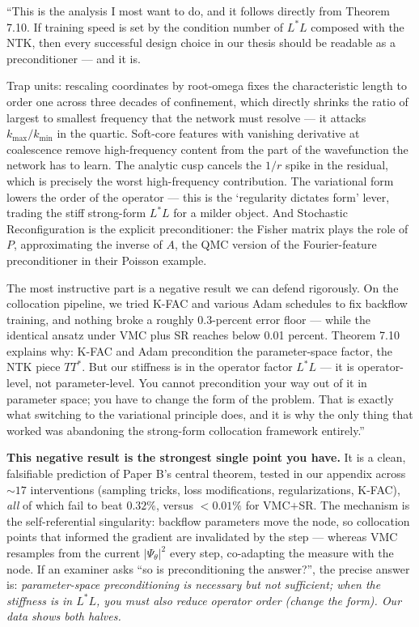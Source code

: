 \documentclass[11pt]{article}
\begin{document}
\begin{say}
``This is the analysis I most want to do, and it follows directly from Theorem 7.10. If training
speed is set by the condition number of $L^\ast L$ composed with the NTK, then every successful
design choice in our thesis should be readable as a preconditioner --- and it is.

Trap units: rescaling coordinates by root-omega fixes the characteristic length to order one across
three decades of confinement, which directly shrinks the ratio of largest to smallest frequency that
the network must resolve --- it attacks $k_{\max}/k_{\min}$ in the quartic. Soft-core features with
vanishing derivative at coalescence remove high-frequency content from the part of the wavefunction
the network has to learn. The analytic cusp cancels the $1/r$ spike in the residual, which is
precisely the worst high-frequency contribution. The variational form lowers the order of the
operator --- this is the `regularity dictates form' lever, trading the stiff strong-form $L^\ast L$
for a milder object. And Stochastic Reconfiguration is the explicit preconditioner: the Fisher matrix
plays the role of $P$, approximating the inverse of $A$, the QMC version of the Fourier-feature
preconditioner in their Poisson example.

The most instructive part is a negative result we can defend rigorously. On the collocation pipeline,
we tried K-FAC and various Adam schedules to fix backflow training, and nothing broke a roughly
0.3-percent error floor --- while the identical ansatz under VMC plus SR reaches below 0.01 percent.
Theorem 7.10 explains why: K-FAC and Adam precondition the parameter-space factor, the NTK piece
$TT^\ast$. But our stiffness is in the operator factor $L^\ast L$ --- it is operator-level, not
parameter-level. You cannot precondition your way out of it in parameter space; you have to change
the form of the problem. That is exactly what switching to the variational principle does, and it is
why the only thing that worked was abandoning the strong-form collocation framework entirely.''
\end{say}

\begin{depth}
\textbf{This negative result is the strongest single point you have.} It is a clean, falsifiable
prediction of Paper B's central theorem, tested in our appendix across $\sim 17$ interventions
(sampling tricks, loss modifications, regularizations, K-FAC), \emph{all} of which fail to beat
$0.32\%$, versus $<0.01\%$ for VMC$+$SR. The mechanism is the self-referential singularity: backflow
parameters move the node, so collocation points that informed the gradient are invalidated by the
step --- whereas VMC resamples from the current $|\Psi_\theta|^2$ every step, co-adapting the measure
with the node. If an examiner asks ``so is preconditioning the answer?'', the precise answer is:
\emph{parameter-space preconditioning is necessary but not sufficient; when the stiffness is in
$L^\ast L$, you must also reduce operator order (change the form). Our data shows both halves.}
\end{depth}
\end{document}
